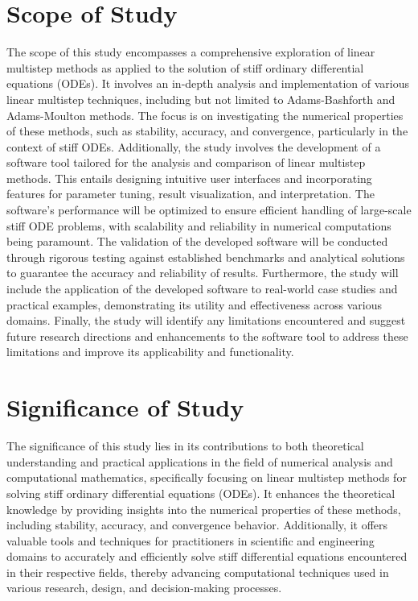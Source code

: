 \section{Scope of Study}
The scope of this study encompasses a comprehensive exploration of linear multistep methods as applied to the solution of stiff ordinary differential equations (ODEs). It involves an in-depth analysis and implementation of various linear multistep techniques, including but not limited to Adams-Bashforth and Adams-Moulton methods. The focus is on investigating the numerical properties of these methods, such as stability, accuracy, and convergence, particularly in the context of stiff ODEs. Additionally, the study involves the development of a software tool tailored for the analysis and comparison of linear multistep methods. This entails designing intuitive user interfaces and incorporating features for parameter tuning, result visualization, and interpretation. The software's performance will be optimized to ensure efficient handling of large-scale stiff ODE problems, with scalability and reliability in numerical computations being paramount. The validation of the developed software will be conducted through rigorous testing against established benchmarks and analytical solutions to guarantee the accuracy and reliability of results. Furthermore, the study will include the application of the developed software to real-world case studies and practical examples, demonstrating its utility and effectiveness across various domains. Finally, the study will identify any limitations encountered and suggest future research directions and enhancements to the software tool to address these limitations and improve its applicability and functionality.

\section{Significance of Study}
The significance of this study lies in its contributions to both theoretical understanding and practical applications in the field of numerical analysis and computational mathematics, specifically focusing on linear multistep methods for solving stiff ordinary differential equations (ODEs). It enhances the theoretical knowledge by providing insights into the numerical properties of these methods, including stability, accuracy, and convergence behavior. Additionally, it offers valuable tools and techniques for practitioners in scientific and engineering domains to accurately and efficiently solve stiff differential equations encountered in their respective fields, thereby advancing computational techniques used in various research, design, and decision-making processes.



